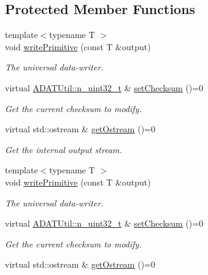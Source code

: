 \subsection*{Protected Member Functions}
\begin{DoxyCompactItemize}
\item 
{\footnotesize template$<$typename T $>$ }\\void \mbox{\hyperlink{classADATIO_1_1BinaryWriter_a4415e2d04de75ea6310a8eed3be8f43e}{write\+Primitive}} (const T \&output)
\begin{DoxyCompactList}\small\item\em The universal data-\/writer. \end{DoxyCompactList}\item 
virtual \mbox{\hyperlink{namespaceADATUtil_ad945a8afa4db2d1f89b731964adae97e}{A\+D\+A\+T\+Util\+::n\+\_\+uint32\+\_\+t}} \& \mbox{\hyperlink{classADATIO_1_1BinaryWriter_ae64230370824192d1f0dbcaa8e74017a}{set\+Checksum}} ()=0
\begin{DoxyCompactList}\small\item\em Get the current checksum to modify. \end{DoxyCompactList}\item 
virtual std\+::ostream \& \mbox{\hyperlink{classADATIO_1_1BinaryWriter_a4fe227341d17d012bb83a070c208dac0}{get\+Ostream}} ()=0
\begin{DoxyCompactList}\small\item\em Get the internal output stream. \end{DoxyCompactList}\item 
{\footnotesize template$<$typename T $>$ }\\void \mbox{\hyperlink{classADATIO_1_1BinaryWriter_a4415e2d04de75ea6310a8eed3be8f43e}{write\+Primitive}} (const T \&output)
\begin{DoxyCompactList}\small\item\em The universal data-\/writer. \end{DoxyCompactList}\item 
virtual \mbox{\hyperlink{namespaceADATUtil_ad945a8afa4db2d1f89b731964adae97e}{A\+D\+A\+T\+Util\+::n\+\_\+uint32\+\_\+t}} \& \mbox{\hyperlink{classADATIO_1_1BinaryWriter_ae64230370824192d1f0dbcaa8e74017a}{set\+Checksum}} ()=0
\begin{DoxyCompactList}\small\item\em Get the current checksum to modify. \end{DoxyCompactList}\item 
virtual std\+::ostream \& \mbox{\hyperlink{classADATIO_1_1BinaryWriter_a4fe227341d17d012bb83a070c208dac0}{get\+Ostream}} ()=0

\end{DoxyCompactItemize}
